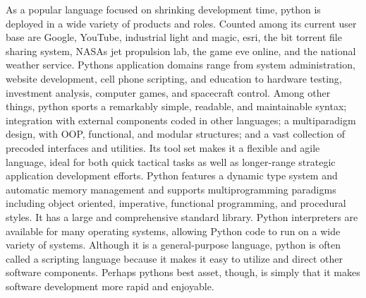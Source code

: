 As a popular language focused on shrinking development time, python is deployed in
a wide variety of products and roles. Counted among its current user base are Google,
YouTube, industrial light and magic, esri, the bit torrent file sharing system, NASA\textquotesingle s
jet propulsion lab, the game eve online, and the national weather service. Python\textquotesingle s
application domains range from system administration, website development, cell
phone scripting, and education to hardware testing, investment analysis, computer games, and spacecraft control. Among other things, python sports a remarkably simple, readable, and maintainable syntax; integration with external components coded in other languages; a multiparadigm design, with OOP, functional, and modular structures; and a vast collection of precoded interfaces and utilities. Its tool set makes it a flexible and agile language,
ideal for both quick tactical tasks as well as longer-range strategic application development efforts. Python features a dynamic type system and automatic memory management and supports multiprogramming paradigms including object oriented, imperative, functional programming, and procedural styles. It has a large and comprehensive standard library. Python interpreters are available for many operating systems, allowing Python code to run on a wide variety of systems. Although it is a general-purpose language, python is often called a scripting language because it makes it easy to utilize and direct other software components. Perhaps python\textquotesingle s best asset, though, is simply that it makes software development more rapid and enjoyable. 

